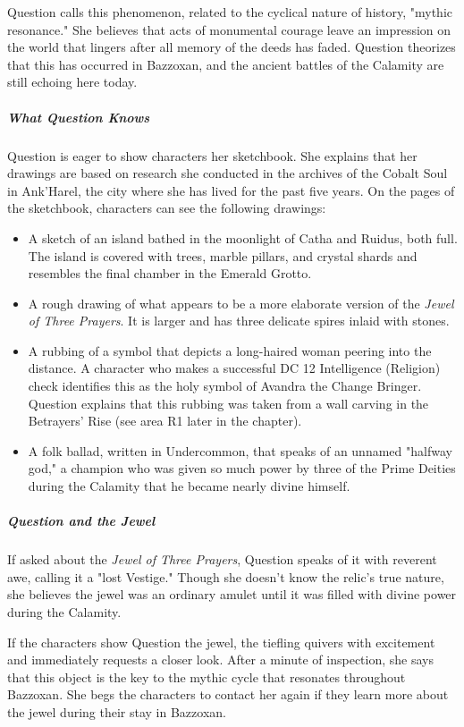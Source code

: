 \documentclass[10pt,a4paper,twoside,fancy,bg=print,twocolumn,openany,nodeprecatedcode]{dndbook}
\begin{document}
Question calls this phenomenon, related to the cyclical nature of history, "mythic resonance." She believes that acts of monumental courage leave an impression on the world that lingers after all memory of the deeds has faded. Question theorizes that this has occurred in Bazzoxan, and the ancient battles of the Calamity are still echoing here today.

\subparagraph{What Question Knows}
Question is eager to show characters her sketchbook. She explains that her drawings are based on research she conducted in the archives of the Cobalt Soul in Ank'Harel, the city where she has lived for the past five years. On the pages of the sketchbook, characters can see the following drawings:


\begin{itemize}
\item A sketch of an island bathed in the moonlight of Catha and Ruidus, both full. The island is covered with trees, marble pillars, and crystal shards and resembles the final chamber in the Emerald Grotto.
\item A rough drawing of what appears to be a more elaborate version of the \textit{Jewel of Three Prayers}. It is larger and has three delicate spires inlaid with stones.
\item A rubbing of a symbol that depicts a long-haired woman peering into the distance. A character who makes a successful DC 12 Intelligence (Religion) check identifies this as the holy symbol of Avandra the Change Bringer. Question explains that this rubbing was taken from a wall carving in the Betrayers' Rise (see area R1 later in the chapter).
\item A folk ballad, written in Undercommon, that speaks of an unnamed "halfway god," a champion who was given so much power by three of the Prime Deities during the Calamity that he became nearly divine himself.
\end{itemize}

\subparagraph{Question and the Jewel}
If asked about the \textit{Jewel of Three Prayers}, Question speaks of it with reverent awe, calling it a "lost Vestige." Though she doesn't know the relic's true nature, she believes the jewel was an ordinary amulet until it was filled with divine power during the Calamity.

If the characters show Question the jewel, the tiefling quivers with excitement and immediately requests a closer look. After a minute of inspection, she says that this object is the key to the mythic cycle that resonates throughout Bazzoxan. She begs the characters to contact her again if they learn more about the jewel during their stay in Bazzoxan.
\end{document}
